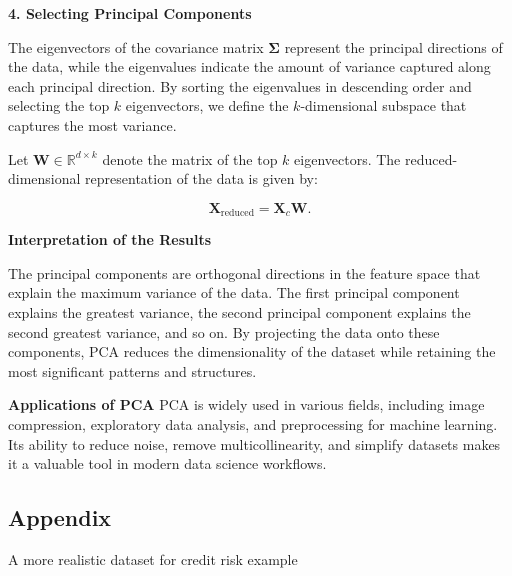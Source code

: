 \documentclass{article}
\begin{document}
    \textbf{4. Selecting Principal Components}

The eigenvectors of the covariance matrix \(\mathbf{\Sigma}\) represent
the principal directions of the data, while the eigenvalues indicate the
amount of variance captured along each principal direction. By sorting
the eigenvalues in descending order and selecting the top \(k\)
eigenvectors, we define the \(k\)-dimensional subspace that captures the
most variance.

Let \(\mathbf{W} \in \mathbb{R}^{d \times k}\) denote the matrix of the
top \(k\) eigenvectors. The reduced-dimensional representation of the
data is given by:

\[
\mathbf{X}_{\text{reduced}} = \mathbf{X}_c \mathbf{W}.
\]

    \textbf{Interpretation of the Results}

The principal components are orthogonal directions in the feature space
that explain the maximum variance of the data. The first principal
component explains the greatest variance, the second principal component
explains the second greatest variance, and so on. By projecting the data
onto these components, PCA reduces the dimensionality of the dataset
while retaining the most significant patterns and structures.

\textbf{Applications of PCA} PCA is widely used in various fields,
including image compression, exploratory data analysis, and
preprocessing for machine learning. Its ability to reduce noise, remove
multicollinearity, and simplify datasets makes it a valuable tool in
modern data science workflows.

    \subsection{Appendix}\label{appendix}

    A more realistic dataset for credit risk example
\end{document}
